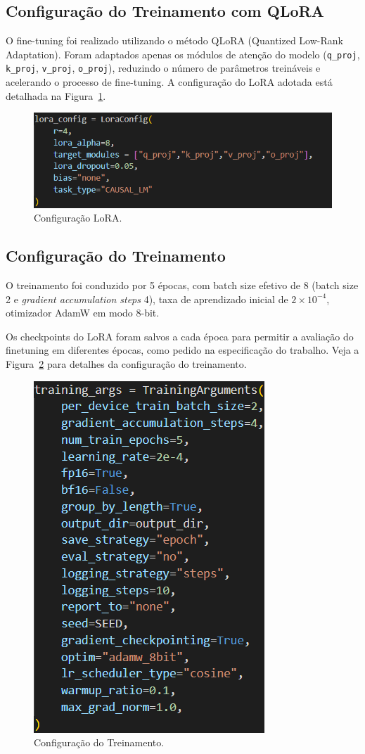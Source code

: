 \documentclass[journal,onecolumn]{IEEEtran}
\newcommand{\figwidth}{0.7\linewidth}
\begin{document}
\subsection{Configuração do Treinamento com QLoRA}

O fine-tuning foi realizado utilizando o método QLoRA (Quantized Low-Rank Adaptation). Foram adaptados apenas os módulos de atenção do modelo (\texttt{q\_proj}, \texttt{k\_proj}, \texttt{v\_proj}, \texttt{o\_proj}), reduzindo o número de parâmetros treináveis e acelerando o processo de fine-tuning. A configuração do LoRA adotada está detalhada na Figura~\ref{fig:lora_config}.

\begin{figure}[!htpb]
    \centering
    \includegraphics[width=\figwidth]{resources/lora_config.png}
    \caption{Configuração LoRA.}
    \label{fig:lora_config}
\end{figure}

\subsection{Configuração do Treinamento}

O treinamento foi conduzido por 5 épocas, com batch size efetivo de 8 (batch size 2 e \textit{gradient accumulation steps} 4), taxa de aprendizado inicial de $2 \times 10^{-4}$, otimizador AdamW em modo 8-bit.

Os checkpoints do LoRA foram salvos a cada época para permitir a avaliação do finetuning em diferentes épocas, como pedido na especificação do trabalho. Veja a Figura~\ref{fig:training_config} para detalhes da configuração do treinamento.

\begin{figure}[!htpb]
    \centering
    \includegraphics[width=0.25\linewidth]{resources/training_config.png}
    \caption{Configuração do Treinamento.}
    \label{fig:training_config}
\end{figure}
\end{document}
